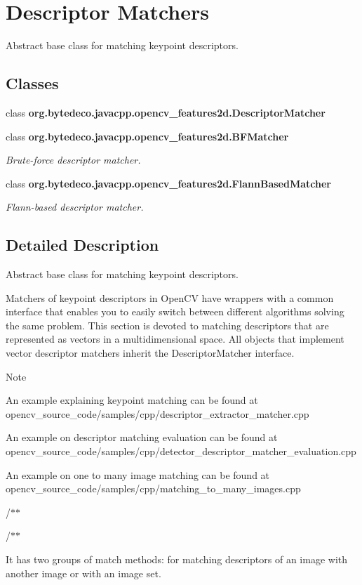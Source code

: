 \hypertarget{group__features2d__match}{}\section{Descriptor Matchers}
\label{group__features2d__match}


Abstract base class for matching keypoint descriptors.  


\subsection*{Classes}
\begin{DoxyCompactItemize}
\item 
class {\bfseries org.\+bytedeco.\+javacpp.\+opencv\+\_\+features2d.\+Descriptor\+Matcher}
\item 
class {\bfseries org.\+bytedeco.\+javacpp.\+opencv\+\_\+features2d.\+B\+F\+Matcher}
\begin{DoxyCompactList}\small\item\em Brute-\/force descriptor matcher. \end{DoxyCompactList}\item 
class {\bfseries org.\+bytedeco.\+javacpp.\+opencv\+\_\+features2d.\+Flann\+Based\+Matcher}
\begin{DoxyCompactList}\small\item\em Flann-\/based descriptor matcher. \end{DoxyCompactList}\end{DoxyCompactItemize}


\subsection{Detailed Description}
Abstract base class for matching keypoint descriptors. 

Matchers of keypoint descriptors in Open\+CV have wrappers with a common interface that enables you to easily switch between different algorithms solving the same problem. This section is devoted to matching descriptors that are represented as vectors in a multidimensional space. All objects that implement vector descriptor matchers inherit the Descriptor\+Matcher interface. 

\begin{DoxyNote}{Note}

\begin{DoxyItemize}
\item An example explaining keypoint matching can be found at opencv\+\_\+source\+\_\+code/samples/cpp/descriptor\+\_\+extractor\+\_\+matcher.\+cpp
\begin{DoxyItemize}
\item An example on descriptor matching evaluation can be found at opencv\+\_\+source\+\_\+code/samples/cpp/detector\+\_\+descriptor\+\_\+matcher\+\_\+evaluation.\+cpp
\item An example on one to many image matching can be found at opencv\+\_\+source\+\_\+code/samples/cpp/matching\+\_\+to\+\_\+many\+\_\+images.\+cpp 
\end{DoxyItemize}
\end{DoxyItemize}
\end{DoxyNote}
/$\ast$$\ast$ 

/$\ast$$\ast$

It has two groups of match methods\+: for matching descriptors of an image with another image or with an image set. 